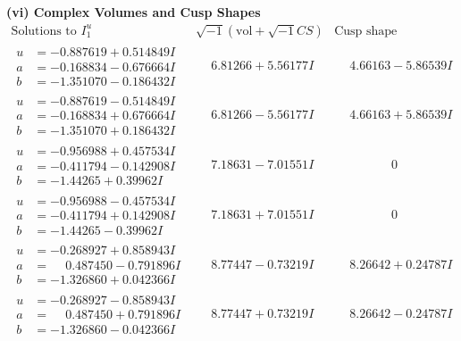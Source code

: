 \documentclass[1p]{elsarticle_modified}
\theoremstyle{definition}
\newcommand{\I}{\sqrt{-1}}
\begin{document}
\newpage\flushleft \textbf{(vi) Complex Volumes and Cusp Shapes}
$$\begin{array}{c|c|c}  
\text{Solutions to }I^u_{1}& \I (\text{vol} + \sqrt{-1}CS) & \text{Cusp shape}\\
 \hline 
\begin{aligned}
u &= -0.887619 + 0.514849 I \\
a &= -0.168834 - 0.676664 I \\
b &= -1.351070 - 0.186432 I\end{aligned}
 & \phantom{-}6.81266 + 5.56177 I & \phantom{-}4.66163 - 5.86539 I \\ \hline\begin{aligned}
u &= -0.887619 - 0.514849 I \\
a &= -0.168834 + 0.676664 I \\
b &= -1.351070 + 0.186432 I\end{aligned}
 & \phantom{-}6.81266 - 5.56177 I & \phantom{-}4.66163 + 5.86539 I \\ \hline\begin{aligned}
u &= -0.956988 + 0.457534 I \\
a &= -0.411794 - 0.142908 I \\
b &= -1.44265 + 0.39962 I\end{aligned}
 & \phantom{-}7.18631 - 7.01551 I & \phantom{-0.000000 } 0 \\ \hline\begin{aligned}
u &= -0.956988 - 0.457534 I \\
a &= -0.411794 + 0.142908 I \\
b &= -1.44265 - 0.39962 I\end{aligned}
 & \phantom{-}7.18631 + 7.01551 I & \phantom{-0.000000 } 0 \\ \hline\begin{aligned}
u &= -0.268927 + 0.858943 I \\
a &= \phantom{-}0.487450 - 0.791896 I \\
b &= -1.326860 + 0.042366 I\end{aligned}
 & \phantom{-}8.77447 - 0.73219 I & \phantom{-}8.26642 + 0.24787 I \\ \hline\begin{aligned}
u &= -0.268927 - 0.858943 I \\
a &= \phantom{-}0.487450 + 0.791896 I \\
b &= -1.326860 - 0.042366 I\end{aligned}
 & \phantom{-}8.77447 + 0.73219 I & \phantom{-}8.26642 - 0.24787 I \\ \hline\begin{aligned}

\end{aligned}
\end{array}$$
\end{document}
